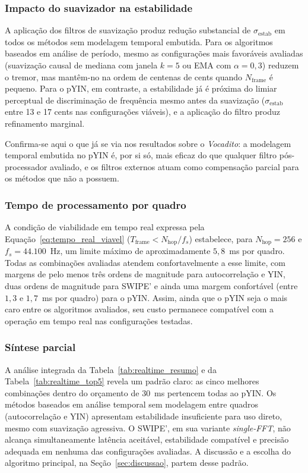   \subsubsection{Impacto do suavizador na estabilidade}

  A aplicação dos filtros de suavização produz redução substancial de
  $\sigma_{\text{estab}}$ em todos os métodos sem modelagem temporal embutida.
  Para os algoritmos baseados em análise de período, mesmo as configurações
  mais favoráveis avaliadas (suavização causal de mediana com janela $k = 5$ ou
  EMA com $\alpha = 0{,}3$) reduzem o tremor, mas mantêm-no na ordem de
  centenas de cents quando $N_{\text{frame}}$ é pequeno. Para o pYIN, em
  contraste, a estabilidade já é próxima do limiar perceptual de discriminação
  de frequência \cite{moore2012hearing} mesmo antes da
  suavização ($\sigma_{\text{estab}}$ entre 13 e 17 cents nas configurações
  viáveis), e a aplicação do filtro produz refinamento marginal.

  Confirma-se aqui o que já se via nos resultados sobre o
  \textit{Vocadito}: a modelagem temporal embutida no pYIN é, por si só,
  mais eficaz do que qualquer filtro pós-processador avaliado, e os filtros
  externos atuam como compensação parcial para os métodos que não a possuem.

  \subsubsection{Tempo de processamento por quadro}

  A condição de viabilidade em tempo real expressa pela
  Equação~\ref{eq:tempo_real_viavel} ($T_{\text{frame}} < N_{\text{hop}}/f_s$)
  estabelece, para $N_{\text{hop}} = 256$ e $f_s = 44{.}100$~Hz, um limite
  máximo de aproximadamente $5{,}8$~ms por quadro. Todas as combinações
  avaliadas atendem confortavelmente a esse limite, com margens de pelo menos
  três ordens de magnitude para autocorrelação e YIN, duas ordens de magnitude
  para SWIPE' e ainda uma margem confortável (entre $1{,}3$ e $1{,}7$~ms por
  quadro) para o pYIN. Assim, ainda que o pYIN seja o mais caro entre os
  algoritmos avaliados, seu custo permanece compatível com a operação em tempo
  real nas configurações testadas.

  \subsubsection{Síntese parcial}

  A análise integrada da Tabela~\ref{tab:realtime_resumo} e da
  Tabela~\ref{tab:realtime_top5} revela um padrão claro: as cinco melhores
  combinações dentro do orçamento de 30~ms pertencem todas ao pYIN. Os métodos
  baseados em análise temporal sem modelagem entre quadros (autocorrelação e
  YIN) apresentam estabilidade insuficiente para uso direto, mesmo com
  suavização agressiva. O SWIPE', em sua variante \textit{single-FFT}, não
  alcança simultaneamente latência aceitável, estabilidade compatível e
  precisão adequada em nenhuma das configurações avaliadas. A discussão e a escolha do algoritmo principal, na
  Seção~\ref{sec:discussao}, partem desse padrão.

